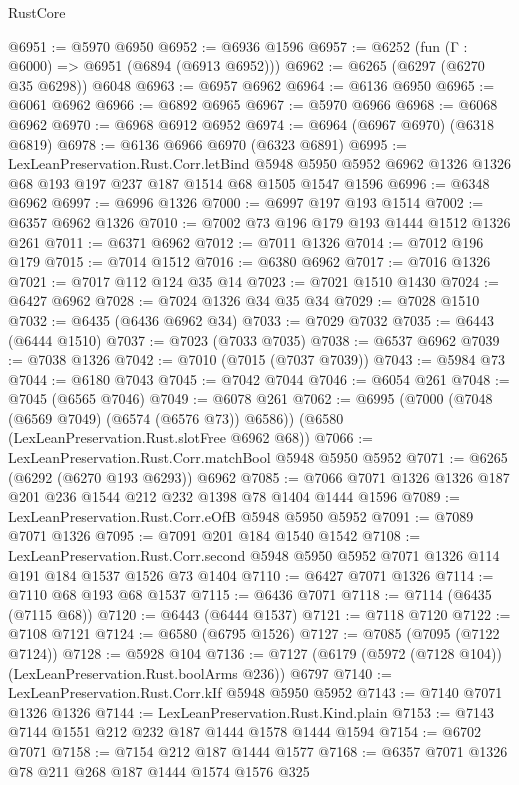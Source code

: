 \begin{lexlean}{RustCore}
\begin{coremodule}
@6951 := @5970 @6950
@6952 := @6936 @1596
@6957 := @6252 (fun (Γ : @6000) => @6951 (@6894 (@6913 @6952)))
@6962 := @6265 (@6297 (@6270 @35 @6298)) @6048
@6963 := @6957 @6962
@6964 := @6136 @6950
@6965 := @6061 @6962
@6966 := @6892 @6965
@6967 := @5970 @6966
@6968 := @6068 @6962
@6970 := @6968 @6912 @6952
@6974 := @6964 (@6967 @6970) (@6318 @6819)
@6978 := @6136 @6966 @6970 (@6323 @6891)
@6995 := LexLeanPreservation.Rust.Corr.letBind
    @5948
    @5950
    @5952
    @6962
    @1326
    @1326
    @68
    @193
    @197
    @237
    @187
    @1514
    @68
    @1505
    @1547
    @1596
@6996 := @6348 @6962
@6997 := @6996 @1326
@7000 := @6997 @197 @193 @1514
@7002 := @6357 @6962 @1326
@7010 := @7002 @73 @196 @179 @193 @1444 @1512 @1326 @261
@7011 := @6371 @6962
@7012 := @7011 @1326
@7014 := @7012 @196 @179
@7015 := @7014 @1512
@7016 := @6380 @6962
@7017 := @7016 @1326
@7021 := @7017 @112 @124 @35 @14
@7023 := @7021 @1510 @1430
@7024 := @6427 @6962
@7028 := @7024 @1326 @34 @35 @34
@7029 := @7028 @1510
@7032 := @6435 (@6436 @6962 @34)
@7033 := @7029 @7032
@7035 := @6443 (@6444 @1510)
@7037 := @7023 (@7033 @7035)
@7038 := @6537 @6962
@7039 := @7038 @1326
@7042 := @7010 (@7015 (@7037 @7039))
@7043 := @5984 @73
@7044 := @6180 @7043
@7045 := @7042 @7044
@7046 := @6054 @261
@7048 := @7045 (@6565 @7046)
@7049 := @6078 @261
@7062 := @6995
    (@7000 (@7048 (@6569 @7049) (@6574 (@6576 @73)) @6586))
    (@6580 (LexLeanPreservation.Rust.slotFree @6962 @68))
@7066 := LexLeanPreservation.Rust.Corr.matchBool @5948 @5950 @5952
@7071 := @6265 (@6292 (@6270 @193 @6293)) @6962
@7085 := @7066 @7071 @1326 @1326 @187 @201 @236 @1544 @212 @232 @1398 @78 @1404 @1444 @1596
@7089 := LexLeanPreservation.Rust.Corr.eOfB @5948 @5950 @5952
@7091 := @7089 @7071 @1326
@7095 := @7091 @201 @184 @1540 @1542
@7108 := LexLeanPreservation.Rust.Corr.second
    @5948
    @5950
    @5952
    @7071
    @1326
    @114
    @191
    @184
    @1537
    @1526
    @73
    @1404
@7110 := @6427 @7071 @1326
@7114 := @7110 @68 @193 @68 @1537
@7115 := @6436 @7071
@7118 := @7114 (@6435 (@7115 @68))
@7120 := @6443 (@6444 @1537)
@7121 := @7118 @7120
@7122 := @7108 @7121
@7124 := @6580 (@6795 @1526)
@7127 := @7085 (@7095 (@7122 @7124))
@7128 := @5928 @104
@7136 := @7127 (@6179 (@5972 (@7128 @104)) (LexLeanPreservation.Rust.boolArms @236)) @6797
@7140 := LexLeanPreservation.Rust.Corr.kIf @5948 @5950 @5952
@7143 := @7140 @7071 @1326 @1326
@7144 := LexLeanPreservation.Rust.Kind.plain
@7153 := @7143 @7144 @1551 @212 @232 @187 @1444 @1578 @1444 @1594
@7154 := @6702 @7071
@7158 := @7154 @212 @187 @1444 @1577
@7168 := @6357 @7071 @1326 @78 @211 @268 @187 @1444 @1574 @1576 @325

\end{coremodule}
\end{lexlean}
